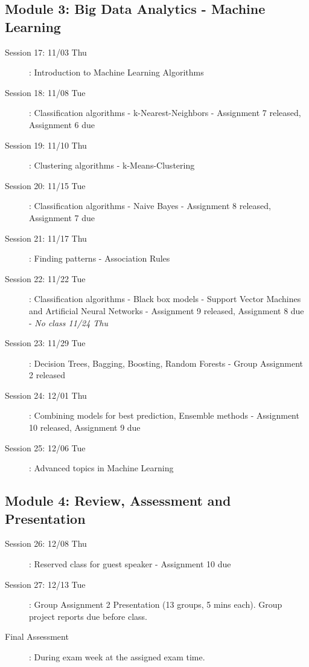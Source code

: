 \documentclass[11pt, letterpaper, twoside]{memoir}\usepackage{knitr}
\begin{document}
\subsection{Module 3: Big Data Analytics - Machine Learning}
\begin{description}
\item [Session 17: 11/03 Thu]: Introduction to Machine Learning Algorithms


\item [Session 18: 11/08 Tue]: Classification algorithms - k-Nearest-Neighbors
    - Assignment 7 released, Assignment 6 due

\item [Session 19: 11/10 Thu]: Clustering algorithms - k-Means-Clustering
    

\item [Session 20: 11/15 Tue]: Classification algorithms - Naive Bayes
    - Assignment 8 released, Assignment 7 due

\item [Session 21: 11/17 Thu]: Finding patterns - Association Rules


\item [Session 22: 11/22 Tue]: Classification algorithms - Black box models - Support Vector Machines and Artificial Neural Networks
    - Assignment 9 released, Assignment 8 due
    - \emph{No class 11/24 Thu}
    
\item [Session 23: 11/29 Tue]: Decision Trees, Bagging, Boosting, Random Forests
    - Group Assignment 2 released

\item [Session 24: 12/01 Thu]: Combining models for best prediction, Ensemble methods 
    - Assignment 10 released, Assignment 9 due 

\item [Session 25: 12/06 Tue]: Advanced topics in Machine Learning
\end{description}

\subsection{Module 4: Review, Assessment and Presentation}
\begin{description}
\item [Session 26: 12/08 Thu]: Reserved class for guest speaker
    - Assignment 10 due

\item [Session 27: 12/13 Tue]: Group Assignment 2 Presentation (13 groups, 5 mins each). Group project reports due before class.

\item [Final Assessment]: During exam week at the assigned exam time.
\end{description}
\end{document}
